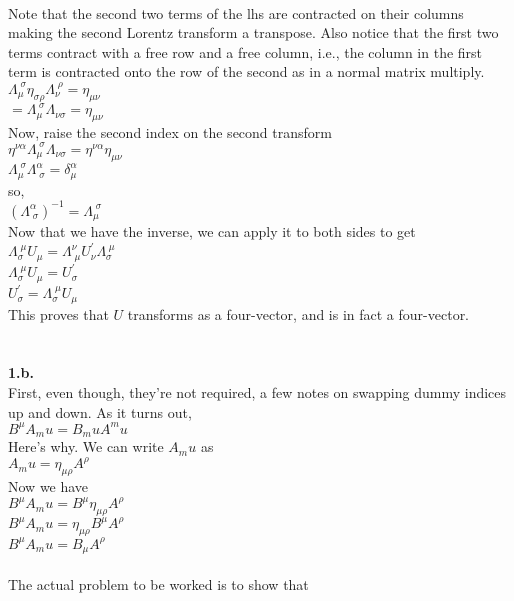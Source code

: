 \documentclass[prb,preprint]
{revtex4-1}
\newcommand{\PRLsep}{\noindent\makebox[\linewidth]{\resizebox{0.8888\linewidth}{2pt}{$\bullet$}}\bigskip}
\begin{document}
\\
Note that the second two terms of the lhs are contracted on their columns making the second Lorentz transform a transpose.  Also notice that the first two terms contract with a free row and a free column, i.e., the column in the first term is contracted onto the row of the second as in a normal matrix multiply.
\\
$\Lambda_\mu^{\;\sigma} \eta_{\sigma \rho} \Lambda_\nu^{\;\rho} = \eta_{\mu\nu}$
\\
$  = \Lambda_\mu^{\;\sigma} \Lambda_{\nu\sigma} = \eta_{\mu\nu}$
\\
Now, raise the second index on the second transform
\\
$\eta^{\nu\alpha} \Lambda_\mu^{\;\sigma} \Lambda_{\nu\sigma} = \eta^{\nu\alpha} \eta_{\mu\nu}$
\\
$\Lambda_\mu^{\;\sigma} \Lambda^\alpha_{\;\sigma} = \delta^\alpha_\mu$
\\
so,
\\
$\left(\Lambda^\alpha_{\;\sigma}\right)^{-1} = \Lambda_\mu^{\;\sigma}$
\\
Now that we have the inverse, we can apply it to both sides to get
\\
$\Lambda_\sigma^{\;\mu} U_\mu = \Lambda^\nu_{\;\mu} U^\prime_\nu \Lambda_\sigma^{\;\mu} $
\\
$\Lambda_\sigma^{\;\mu} U_\mu = U^\prime_\sigma$
\\
$U^\prime_\sigma = \Lambda_\sigma^{\;\mu} U_\mu$
\\
This proves that $U$ transforms as a four-vector, and is in fact a four-vector.
\\
\\
\PRLsep
\\
\textbf{1.b.}
\\
First, even though, they're not required, a few notes on swapping dummy indices up and down.  As it turns out,
\\
$B^\mu A_mu = B_mu A^mu$
\\
Here's why.  We can write $A_mu$ as
\\
$A_mu = \eta_{\mu\rho}A^\rho$
\\
Now we have
\\
$B^\mu A_mu = B^\mu \eta_{\mu\rho} A^\rho$
\\
$B^\mu A_mu = \eta_{\mu\rho} B^\mu A^\rho$
\\
$B^\mu A_mu = B_\mu A^\rho$
\\
\\
The actual problem to be worked is to show that
\end{document}
